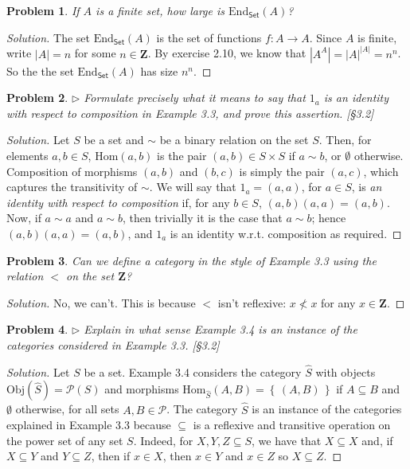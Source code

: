 \documentclass[fontsize=14pt]{scrartcl}
\newtheorem{problem-internal}{Problem}[subsection]
\newenvironment{problem}{
  \medskip
  \begin{problem-internal}
}{
  \end{problem-internal}
}
\newenvironment{solution}{
  \begin{proof}[Solution]
  \vspace{-8px}
  \setlength{\parskip}{4px}
  \setlength{\parindent}{0px}
}{
  \end{proof}
}
\newcommand{\set}[1]{\left\{\,#1\,\right\}}
\newcommand{\Obj}{\mathrm{Obj}}
\newcommand{\Hom}{\mathrm{Hom}}
\newcommand{\abs}[1]{\left|#1\right|}
\begin{document}
\begin{problem}
If $A$ is a finite set, how large is $\mathrm{End}_{\mathsf{Set}}(A)$?
\end{problem}

\begin{solution}
The set $\mathrm{End}_{\mathsf{Set}}(A)$ is the set of functions $f:A\to A$.
Since $A$ is finite, write $\abs{A} = n$ for some $n\in\mathbf{Z}$. By exercise
2.10, we know that $\abs{A^A} = \abs{A}^{\abs{A}} = n^n$. So the the set
$\mathrm{End}_{\mathsf{Set}}(A)$ has size $n^n$.
\end{solution}


\begin{problem}
$\rhd$ Formulate precisely what it means to say that $1_a$ is an identity with
respect to composition in Example 3.3, and prove this assertion. [\S3.2]
\end{problem}

\begin{solution}
Let $S$ be a set and $\sim$ be a binary relation on the set $S$. Then, for
elements $a,b\in S$, $\Hom(a,b)$ is the pair $(a,b)\in S\times S$ if $a\sim b$,
or $\emptyset$ otherwise. Composition of morphisms $(a,b)$ and $(b,c)$ is simply
the pair $(a,c)$, which captures the transitivity of $\sim$. We will say that
$1_a = (a,a)$, for $a\in S$, is \textit{an identity with respect to composition}
if, for any $b\in S$, $(a,b)(a,a) = (a,b)$. Now, if $a\sim a$ and $a\sim b$,
then trivially it is the case that $a\sim b$; hence $(a,b)(a,a) = (a,b)$, and
$1_a$ is an identity w.r.t. composition as required.
\end{solution}


\begin{problem}
Can we define a category in the style of Example 3.3 using the relation $<$ on
the set $\mathbf{Z}$?
\end{problem}

\begin{solution}
No, we can't. This is because $<$ isn't reflexive: $x\not<x$ for any
$x\in\mathbf{Z}$.
\end{solution}


\begin{problem}
$\rhd$ Explain in what sense Example 3.4 is an instance of the categories
considered in Example 3.3. [\S 3.2]
\end{problem}

\begin{solution}
Let $S$ be a set. Example 3.4 considers the category $\hat{S}$ with objects
$\Obj(\hat{S}) = \mathscr{P}(S)$ and morphisms $\Hom_{\hat{S}}(A,B) =
\set{(A,B)}$ if $A\subseteq B$ and $\emptyset$ otherwise, for all sets
$A,B\in\mathscr{P}$. The category $\hat{S}$ is an instance of the categories
explained in Example 3.3 because $\subseteq$ is a reflexive and transitive
operation on the power set of any set $S$. Indeed, for $X,Y,Z\subseteq S$, we have
that $X\subseteq X$ and, if $X\subseteq Y$ and $Y\subseteq Z$, then if $x\in X$,
then $x\in Y$ and $x\in Z$ so $X\subseteq Z$.
\end{solution}
\end{document}
